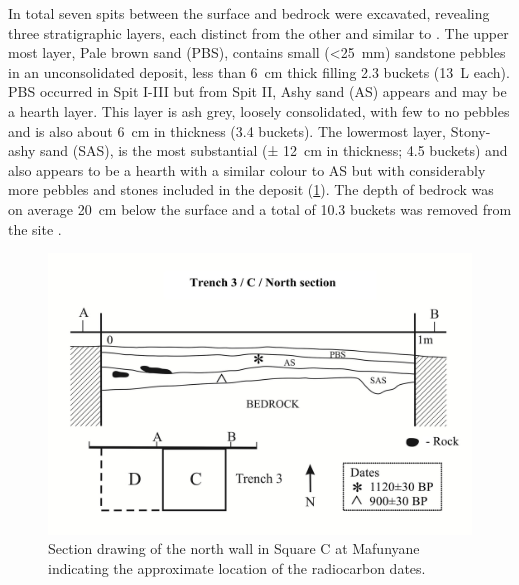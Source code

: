 \documentclass{ijsra}
\begin{document}
In total seven spits between the surface and bedrock were excavated, revealing three stratigraphic layers, each distinct from the other and similar to \textcite{Walker_1994}. 
The upper most layer, Pale brown sand (PBS), contains small (<\SI{25}{\milli\meter}) sandstone pebbles in an unconsolidated deposit,
 less than \SI{6}{\centi\meter} thick filling \num{2,3} buckets (\SI{13}{\liter} each). 
PBS occurred in Spit I-III but from Spit II, Ashy sand (AS) appears and may be a hearth layer. 
This layer is ash grey, loosely consolidated, with few to no pebbles and is also about \SI{6}{\centi\meter} in thickness (\num{3.4} buckets). 
The lowermost layer, Stony-ashy sand (SAS), is the most substantial (± \SI{12}{\centi\meter} in thickness; \num{4.5} buckets) and also appears to be a hearth with a similar colour to AS but with considerably more pebbles and stones included in the deposit (\cref{fig:Forssman-Figure03}). The depth of bedrock was on average \SI{20}{\centi\meter} below the surface and a total of \num{10.3} buckets was removed from the site \parencite[for more details see][95]{Forssman_2014a}. 

	\begin{figure}
		\includegraphics[width=\linewidth]{figures/Forssman-Figure03}
		\caption{Section drawing of the north wall in Square C at Mafunyane indicating the approximate location of the radiocarbon dates.}
		\centering
		\label{fig:Forssman-Figure03}
	\end{figure}
\end{document}

